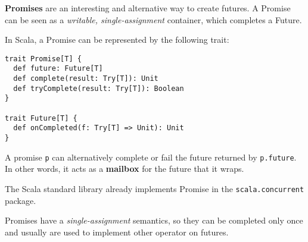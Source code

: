 \textbf{Promises} are an interesting and alternative way to create
futures. A Promise can be seen as a \emph{writable, single-assignment}
container, which completes a Future.

In Scala, a Promise can be represented by the following trait:

\begin{verbatim}
trait Promise[T] {
  def future: Future[T]
  def complete(result: Try[T]): Unit
  def tryComplete(result: Try[T]): Boolean
}

trait Future[T] {
  def onCompleted(f: Try[T] => Unit): Unit
}
\end{verbatim}

A promise \texttt{p} can alternatively complete or fail the future
returned by \texttt{p.future}. In other words, it acts as a
\textbf{mailbox} for the future that it wraps.

The Scala standard library already implements Promise in the
\texttt{scala.concurrent} package.

Promises have a \emph{single-assignment} semantics, so they can be
completed only once and usually are used to implement other operator on
futures.
